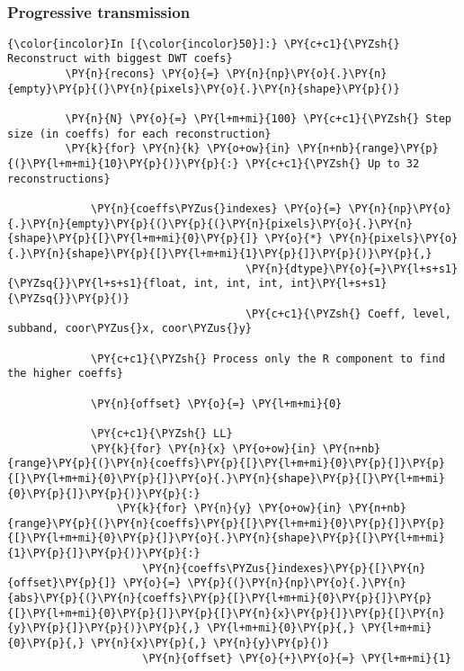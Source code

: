     \begin{center}
    \end{center}
    { \hspace*{\fill} \\}
    
    \hypertarget{progressive-transmission}{%
\subsubsection{Progressive
transmission}\label{progressive-transmission}}

    \begin{Verbatim}[commandchars=\\\{\}]
{\color{incolor}In [{\color{incolor}50}]:} \PY{c+c1}{\PYZsh{} Reconstruct with biggest DWT coefs}
         \PY{n}{recons} \PY{o}{=} \PY{n}{np}\PY{o}{.}\PY{n}{empty}\PY{p}{(}\PY{n}{pixels}\PY{o}{.}\PY{n}{shape}\PY{p}{)}
         
         \PY{n}{N} \PY{o}{=} \PY{l+m+mi}{100} \PY{c+c1}{\PYZsh{} Step size (in coeffs) for each reconstruction}
         \PY{k}{for} \PY{n}{k} \PY{o+ow}{in} \PY{n+nb}{range}\PY{p}{(}\PY{l+m+mi}{10}\PY{p}{)}\PY{p}{:} \PY{c+c1}{\PYZsh{} Up to 32 reconstructions}
         
             \PY{n}{coeffs\PYZus{}indexes} \PY{o}{=} \PY{n}{np}\PY{o}{.}\PY{n}{empty}\PY{p}{(}\PY{p}{(}\PY{n}{pixels}\PY{o}{.}\PY{n}{shape}\PY{p}{[}\PY{l+m+mi}{0}\PY{p}{]} \PY{o}{*} \PY{n}{pixels}\PY{o}{.}\PY{n}{shape}\PY{p}{[}\PY{l+m+mi}{1}\PY{p}{]}\PY{p}{)}\PY{p}{,}
                                     \PY{n}{dtype}\PY{o}{=}\PY{l+s+s1}{\PYZsq{}}\PY{l+s+s1}{float, int, int, int, int}\PY{l+s+s1}{\PYZsq{}}\PY{p}{)}
                                     \PY{c+c1}{\PYZsh{} Coeff, level, subband, coor\PYZus{}x, coor\PYZus{}y}
         
             \PY{c+c1}{\PYZsh{} Process only the R component to find the higher coeffs}
             
             \PY{n}{offset} \PY{o}{=} \PY{l+m+mi}{0}
             
             \PY{c+c1}{\PYZsh{} LL}
             \PY{k}{for} \PY{n}{x} \PY{o+ow}{in} \PY{n+nb}{range}\PY{p}{(}\PY{n}{coeffs}\PY{p}{[}\PY{l+m+mi}{0}\PY{p}{]}\PY{p}{[}\PY{l+m+mi}{0}\PY{p}{]}\PY{o}{.}\PY{n}{shape}\PY{p}{[}\PY{l+m+mi}{0}\PY{p}{]}\PY{p}{)}\PY{p}{:}
                 \PY{k}{for} \PY{n}{y} \PY{o+ow}{in} \PY{n+nb}{range}\PY{p}{(}\PY{n}{coeffs}\PY{p}{[}\PY{l+m+mi}{0}\PY{p}{]}\PY{p}{[}\PY{l+m+mi}{0}\PY{p}{]}\PY{o}{.}\PY{n}{shape}\PY{p}{[}\PY{l+m+mi}{1}\PY{p}{]}\PY{p}{)}\PY{p}{:}
                     \PY{n}{coeffs\PYZus{}indexes}\PY{p}{[}\PY{n}{offset}\PY{p}{]} \PY{o}{=} \PY{p}{(}\PY{n}{np}\PY{o}{.}\PY{n}{abs}\PY{p}{(}\PY{n}{coeffs}\PY{p}{[}\PY{l+m+mi}{0}\PY{p}{]}\PY{p}{[}\PY{l+m+mi}{0}\PY{p}{]}\PY{p}{[}\PY{n}{x}\PY{p}{]}\PY{p}{[}\PY{n}{y}\PY{p}{]}\PY{p}{)}\PY{p}{,} \PY{l+m+mi}{0}\PY{p}{,} \PY{l+m+mi}{0}\PY{p}{,} \PY{n}{x}\PY{p}{,} \PY{n}{y}\PY{p}{)}
                     \PY{n}{offset} \PY{o}{+}\PY{o}{=} \PY{l+m+mi}{1}
             

\end{Verbatim}
